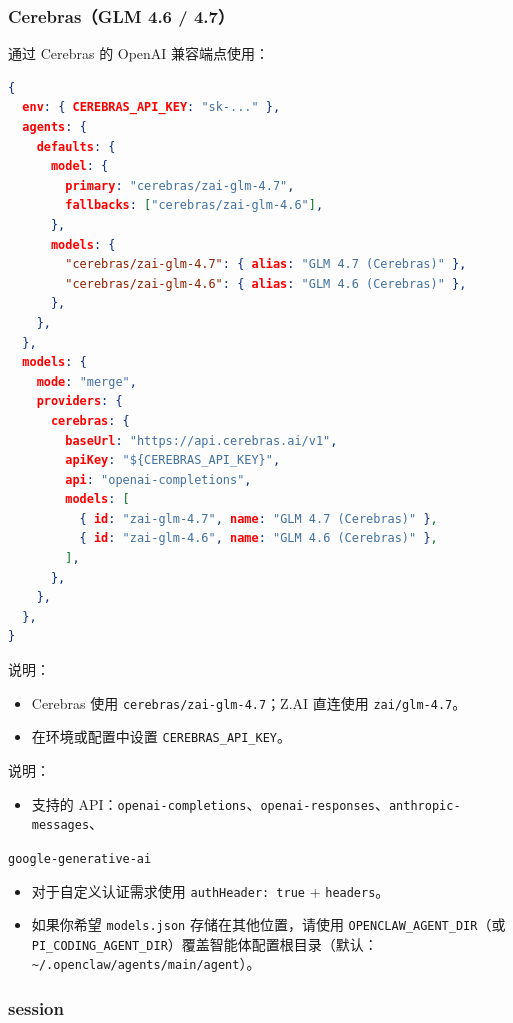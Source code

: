 \subsubsection{Cerebras（GLM 4.6 / 4.7）}


通过 Cerebras 的 OpenAI 兼容端点使用：

\begin{lstlisting}[language=json]
{
  env: { CEREBRAS_API_KEY: "sk-..." },
  agents: {
    defaults: {
      model: {
        primary: "cerebras/zai-glm-4.7",
        fallbacks: ["cerebras/zai-glm-4.6"],
      },
      models: {
        "cerebras/zai-glm-4.7": { alias: "GLM 4.7 (Cerebras)" },
        "cerebras/zai-glm-4.6": { alias: "GLM 4.6 (Cerebras)" },
      },
    },
  },
  models: {
    mode: "merge",
    providers: {
      cerebras: {
        baseUrl: "https://api.cerebras.ai/v1",
        apiKey: "${CEREBRAS_API_KEY}",
        api: "openai-completions",
        models: [
          { id: "zai-glm-4.7", name: "GLM 4.7 (Cerebras)" },
          { id: "zai-glm-4.6", name: "GLM 4.6 (Cerebras)" },
        ],
      },
    },
  },
}
\end{lstlisting}


说明：

\begin{itemize}
  \item Cerebras 使用 \texttt{cerebras/zai-glm-4.7}；Z.AI 直连使用 \texttt{zai/glm-4.7}。
  \item 在环境或配置中设置 \texttt{CEREBRAS\_API\_KEY}。
\end{itemize}


说明：

\begin{itemize}
  \item 支持的 API：\texttt{openai-completions}、\texttt{openai-responses}、\texttt{anthropic-messages}、
\end{itemize}

\texttt{google-generative-ai}
\begin{itemize}
  \item 对于自定义认证需求使用 \texttt{authHeader: true} + \texttt{headers}。
  \item 如果你希望 \texttt{models.json} 存储在其他位置，请使用 \texttt{OPENCLAW\_AGENT\_DIR}（或 \texttt{PI\_CODING\_AGENT\_DIR}）覆盖智能体配置根目录（默认：\texttt{\textasciitilde{}/.openclaw/agents/main/agent}）。
\end{itemize}


\subsubsection{session}


